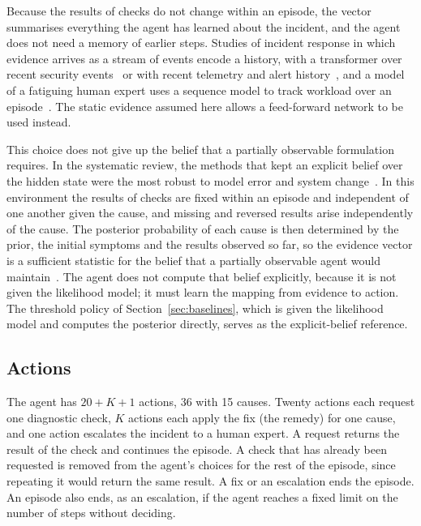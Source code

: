 Because the results of checks do not change within an episode, the vector summarises everything the agent has learned about the incident, and the agent does not need a memory of earlier steps. Studies of incident response in which evidence arrives as a stream of events encode a history, with a transformer over recent security events~\cite{ren2025} or with recent telemetry and alert history~\cite{alauthman2026}, and a model of a fatiguing human expert uses a sequence model to track workload over an episode~\cite{zhang2026falcon}. The static evidence assumed here allows a feed-forward network to be used instead.

This choice does not give up the belief that a partially observable formulation requires. In the systematic review, the methods that kept an explicit belief over the hidden state were the most robust to model error and system change~\cite{opol2026slr,hammar2025,hammar2026belief}. In this environment the results of checks are fixed within an episode and independent of one another given the cause, and missing and reversed results arise independently of the cause. The posterior probability of each cause is then determined by the prior, the initial symptoms and the results observed so far, so the evidence vector is a sufficient statistic for the belief that a partially observable agent would maintain~\cite{kaelbling1998}. The agent does not compute that belief explicitly, because it is not given the likelihood model; it must learn the mapping from evidence to action. The threshold policy of Section~\ref{sec:baselines}, which is given the likelihood model and computes the posterior directly, serves as the explicit-belief reference.

\subsection{Actions}

The agent has $20 + K + 1$ actions, 36 with 15 causes. Twenty actions each request one diagnostic check, $K$ actions each apply the fix (the remedy) for one cause, and one action escalates the incident to a human expert. A request returns the result of the check and continues the episode. A check that has already been requested is removed from the agent's choices for the rest of the episode, since repeating it would return the same result. A fix or an escalation ends the episode. An episode also ends, as an escalation, if the agent reaches a fixed limit on the number of steps without deciding.

